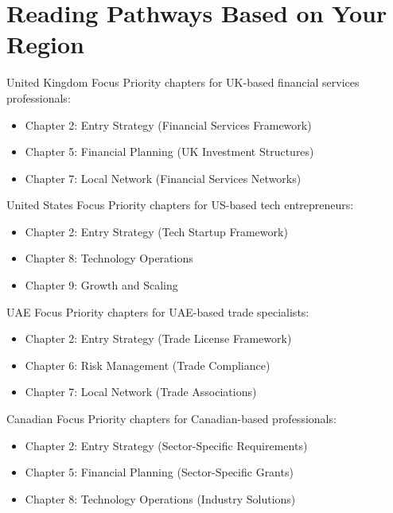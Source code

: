 \section{Reading Pathways Based on Your Region}

\begin{regionalbox}{United Kingdom Focus}
Priority chapters for UK-based financial services professionals:
\begin{itemize}
    \item Chapter 2: Entry Strategy (Financial Services Framework)
    \item Chapter 5: Financial Planning (UK Investment Structures)
    \item Chapter 7: Local Network (Financial Services Networks)
\end{itemize}
\end{regionalbox}

\begin{regionalbox}{United States Focus}
Priority chapters for US-based tech entrepreneurs:
\begin{itemize}
    \item Chapter 2: Entry Strategy (Tech Startup Framework)
    \item Chapter 8: Technology Operations
    \item Chapter 9: Growth and Scaling
\end{itemize}
\end{regionalbox}

\begin{regionalbox}{UAE Focus}
Priority chapters for UAE-based trade specialists:
\begin{itemize}
    \item Chapter 2: Entry Strategy (Trade License Framework)
    \item Chapter 6: Risk Management (Trade Compliance)
    \item Chapter 7: Local Network (Trade Associations)
\end{itemize}
\end{regionalbox}

\begin{regionalbox}{Canadian Focus}
Priority chapters for Canadian-based professionals:
\begin{itemize}
    \item Chapter 2: Entry Strategy (Sector-Specific Requirements)
    \item Chapter 5: Financial Planning (Sector-Specific Grants)
    \item Chapter 8: Technology Operations (Industry Solutions)
\end{itemize}
\end{regionalbox}

